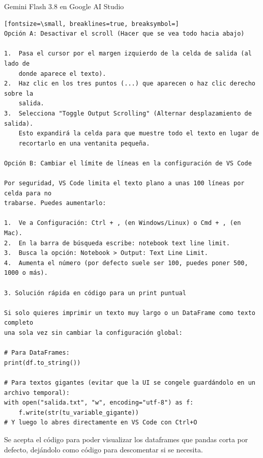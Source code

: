 \documentclass[12pt,a4paper,oneside]{book}
\begin{document}
\begin{iaresp}{Gemini Flash 3.8 en Google AI Studio}
\begin{Verbatim}[fontsize=\small, breaklines=true, breaksymbol=]
Opción A: Desactivar el scroll (Hacer que se vea todo hacia abajo)

1.  Pasa el cursor por el margen izquierdo de la celda de salida (al lado de
    donde aparece el texto).
2.  Haz clic en los tres puntos (...) que aparecen o haz clic derecho sobre la
    salida.
3.  Selecciona "Toggle Output Scrolling" (Alternar desplazamiento de salida).
    Esto expandirá la celda para que muestre todo el texto en lugar de
    recortarlo en una ventanita pequeña.

Opción B: Cambiar el límite de líneas en la configuración de VS Code

Por seguridad, VS Code limita el texto plano a unas 100 líneas por celda para no
trabarse. Puedes aumentarlo:

1.  Ve a Configuración: Ctrl + , (en Windows/Linux) o Cmd + , (en Mac).
2.  En la barra de búsqueda escribe: notebook text line limit.
3.  Busca la opción: Notebook > Output: Text Line Limit.
4.  Aumenta el número (por defecto suele ser 100, puedes poner 500, 1000 o más).

3. Solución rápida en código para un print puntual

Si solo quieres imprimir un texto muy largo o un DataFrame como texto completo
una sola vez sin cambiar la configuración global:

# Para DataFrames:
print(df.to_string())

# Para textos gigantes (evitar que la UI se congele guardándolo en un archivo temporal):
with open("salida.txt", "w", encoding="utf-8") as f:
    f.write(str(tu_variable_gigante))
# Y luego lo abres directamente en VS Code con Ctrl+O
\end{Verbatim}
\end{iaresp}
\begin{iaanalisis}
Se acepta el código para poder visualizar los dataframes que pandas corta por defecto, dejándolo como código para descomentar si se necesita.
\end{iaanalisis}
\end{document}
